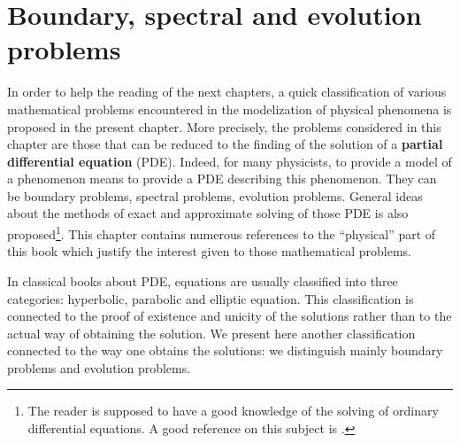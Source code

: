 \documentclass[12pt]{book}
\begin{document}
\section{Boundary, spectral and evolution problems}\label{secchoixesp}
In order to help the reading of the next chapters, a quick classification of
various mathematical problems encountered in the modelization of physical
phenomena is proposed in the present chapter. More precisely, the problems
considered in this chapter are those that can be reduced to the finding of the
solution of a {\bf partial differential equation} (PDE). Indeed, for
many physicists, to provide a model of a phenomenon means to provide a
PDE describing this phenomenon. They can be boundary
problems, spectral problems, evolution problems. General ideas about the
methods of exact
and approximate solving of those PDE is also proposed\footnote{The reader is
  supposed to have a good knowledge of the solving of ordinary differential
  equations. A good reference on this subject is \cite{ma:equad:Arnold83}.}.
This chapter contains numerous references to the ``physical'' part of this
book which justify the interest given to those mathematical problems.

In classical books about PDE, equations are usually classified into three
categories: hyperbolic, parabolic and elliptic equation. This classification is
connected 
to the proof of existence and unicity of the solutions rather than to the
actual way of obtaining the solution. We present here another classification
connected to the way one obtains the solutions: we distinguish mainly
boundary problems and evolution problems.
\end{document}
